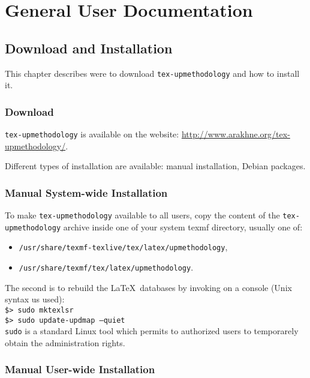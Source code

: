 \documentclass[book]{upmethodology-document}
\begin{document}
\part{General User Documentation}

\chapter{Download and Installation}

This chapter describes were to download \texttt{tex-upmethodology} and how to install it.

\section{Download}

\texttt{tex-upmethodology} is available on the \arakhneorg website: \url{http://www.arakhne.org/tex-upmethodology/}.

Different types of installation are available: manual installation, Debian packages.

\section{Manual System-wide Installation}

To make \texttt{tex-upmethodology} available to all users, copy the content of the \texttt{tex-upmethodology} archive inside one of your system texmf directory, usually one of:
\begin{itemize}
\item \texttt{/usr/share/texmf-texlive/tex/latex/upmethodology},
\item \texttt{/usr/share/texmf/tex/latex/upmethodology}.
\end{itemize}

The second is to rebuild the \LaTeX\ databases by invoking on a console (Unix syntax us used): \\
\texttt{\$> sudo mktexlsr}\\
\texttt{\$> sudo update-updmap --quiet}\\

\texttt{sudo} is a standard Linux tool which permits to authorized users to temporarely obtain the administration rights.

\section{Manual User-wide Installation}
\end{document}
